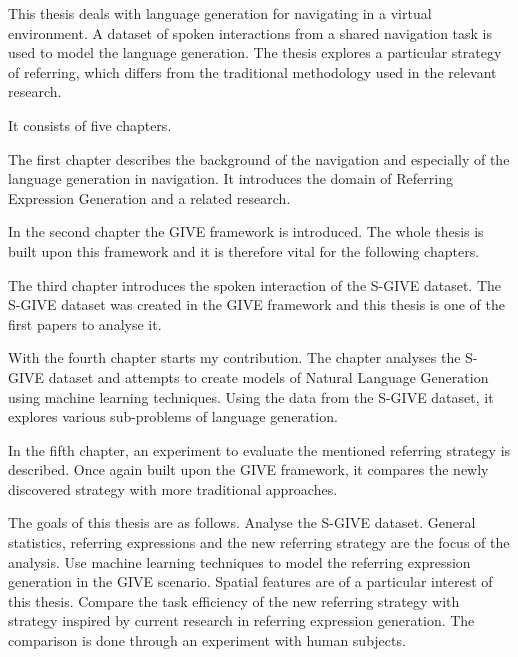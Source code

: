 This thesis deals with language generation for navigating in a virtual environment. A dataset of spoken interactions from a shared navigation task is used to model the language generation. The thesis explores a particular strategy of referring, which differs from the traditional methodology used in the relevant research. 

It consists of five chapters.

The first chapter describes the background of the navigation and especially of the language generation in navigation. It introduces the domain of Referring Expression Generation and a related research.

In the second chapter the GIVE framework is introduced. The whole thesis is built upon this framework and it is therefore vital for the following chapters. 

The third chapter introduces the spoken interaction of the S-GIVE dataset. The S-GIVE dataset was created in the GIVE framework and this thesis is one of the first papers to analyse it.

With the fourth chapter starts my contribution. The chapter analyses the S-GIVE dataset and attempts to create models of Natural Language Generation using machine learning techniques. Using the data from the S-GIVE dataset, it explores various sub-problems of language generation.

In the fifth chapter, an experiment to evaluate the mentioned referring strategy is described. Once again built upon the GIVE framework, it compares the newly discovered strategy with more traditional approaches.   

The goals of this thesis are as follows. Analyse the S-GIVE dataset. General statistics, referring expressions and the new referring strategy are the focus of the analysis. Use machine learning techniques to model the referring expression generation in the GIVE scenario. Spatial features are of a particular interest of this thesis. Compare the task efficiency of the new referring strategy with strategy inspired by current research in referring expression generation. The comparison is done through an experiment with human subjects. 
